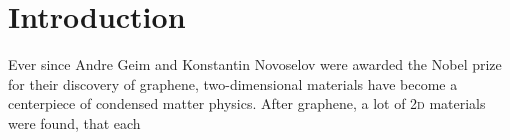 \chapter{Introduction}
Ever since Andre Geim and Konstantin Novoselov were awarded the Nobel prize for their discovery of graphene, two-dimensional materials have become a centerpiece of condensed matter physics. After graphene, a lot of 2\textsc{d} materials were found, that each 
\cite{langer_lightwave_2018}